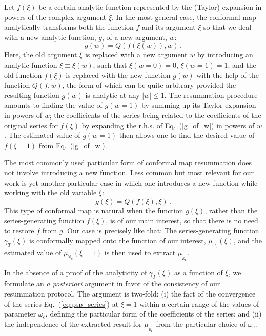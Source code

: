 \documentclass[%
 reprint,
superscriptaddress,
 amsmath,amssymb,
 aps,
prx,
]{revtex4-2}
\newcommand{\txc}{\text{c}}
\newcommand{\txF}{\text{F}}
\begin{document}
\begin{appendices}
Let $f(\xi)$ be a certain analytic function represented by the (Taylor) expansion in powers of the complex argument $\xi$. In the most general case, the conformal map analytically transforms both the function $f$ and its argument $\xi$ so that we deal with a new analytic function, $g$, of a new argument, $w$:
\begin{equation}
g(w) = Q(f(\xi(w)),w) \, .
\label{g_of_w}
\end{equation}
Here, the old argument $\xi$ is replaced with a new argument $w$ by introducing an analytic function $\xi \equiv \xi(w)$, such that $\xi(w=0) = 0$, $\xi(w=1) = 1$; and the old function $f(\xi)$ is replaced with the new function $g(w)$ with the help of the function $Q(f,w)$, the form of which can be quite arbitrary provided the resulting function $g(w)$ is analytic at any $|w|\leq 1$. The resummation procedure amounts to finding the value of $g(w=1)$ by summing up its Taylor expansion in powers of $w$; the coefficients of the series being related to the coefficients of the original series for $f(\xi)$ by expanding the r.h.s. of Eq.~(\ref{g_of_w}) in powers of $w$. The estimated value of $g(w=1)$ then allows one to find the desired value of $f(\xi=1)$ from Eq.~(\ref{g_of_w}).

The most commonly used particular form of conformal map resummation does not involve introducing a new function. Less common but most relevant for our work is yet another particular case in which one introduces a new function while working with the old variable $\xi$:
\begin{equation}
g(\xi) = Q(f(\xi),\xi) \, .
\label{g_of_xi}
\end{equation}
This type of conformal map is natural when the function $g(\xi)$, rather than the series-generating function $f(\xi)$, is of our main interest, so that there is no need to restore $f$ from $g$. Our case is precisely like that: The series-generating function $\gamma_T(\xi)$ is conformally mapped onto the function of our interest, $\mu_{\omega_\txc}(\xi)$, and the estimated value of $\mu_{\omega_\txc}(\xi=1)$ is then used to extract $\mu_{_{E_\txF}}$.

In the absence of a proof of the analyticity of $\gamma_T(\xi)$ as a function of $\xi$, we formulate an \textit{a posteriori} argument in favor of the consistency of our resummation protocol. The argument is two-fold: (i) the fact of the convergence of the series Eq.~(\ref{eq:psp_series}) at $\xi=1$ within a certain range of the values of parameter $\omega_\txc$, defining the particular form of the coefficients of the series; and (ii) the independence of the extracted result for $\mu_{_{E_\txF}}$ from the particular choice of $\omega_\txc$.


\end{appendices}
\end{document}
